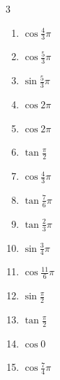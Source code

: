 \begin{multicols}{3}
\begin{enumerate}
  \item $\displaystyle \cos{\frac{4}{3}\pi}$

\columnbreak %

\resetques

  \item $\displaystyle \cos{\frac{5}{3}\pi}$

  \item $\displaystyle \sin{\frac{5}{3}\pi}$

  \item $\displaystyle \cos{2\pi}$
        \phantom{$\displaystyle =1$}

  \item $\displaystyle \cos{2\pi}$
        \phantom{$\displaystyle =1$}

  \item $\displaystyle \tan{\frac{\pi}{2}}$
        \phantom{$\displaystyle \quad なし$}

  \item $\displaystyle \cos{\frac{4}{3}\pi}$

  \item $\displaystyle \tan{\frac{7}{6}\pi}$

  \item $\displaystyle \tan{\frac{2}{3}\pi}$

  \item $\displaystyle \sin{\frac{3}{4}\pi}$

  \item $\displaystyle \cos{\frac{11}{6}\pi}$

  \item $\displaystyle \sin{\frac{\pi}{2}}$
        \phantom{$\displaystyle =1$}

  \item $\displaystyle \tan{\frac{\pi}{2}}$
        \phantom{$\displaystyle \quad なし$}

  \item $\displaystyle \cos{0}$
        \phantom{$\displaystyle =1$}

  \item $\displaystyle \cos{\frac{7}{4}\pi}$


\end{enumerate}
\end{multicols}
